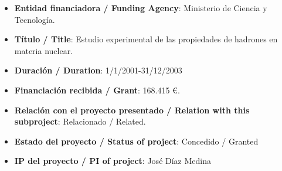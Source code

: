 \begin{enumerate}
\begin{itemize}
\item {\bf Entidad financiadora / Funding Agency}: Ministerio de Ciencia y Tecnología.
\item {\bf Título / Title}: Estudio experimental de las propiedades de hadrones en materia nuclear.
\item {\bf Duración / Duration}: 1/1/2001-31/12/2003
\item {\bf Financiación recibida / Grant}: 168.415   \euro. 
\item {\bf Relación con el proyecto presentado / Relation with this subproject}: Relacionado / Related. 
\item {\bf Estado del proyecto / Status of project}: Concedido / Granted
\item {\bf IP del proyecto / PI of project}: José Díaz Medina
\end{itemize}
\end{enumerate}